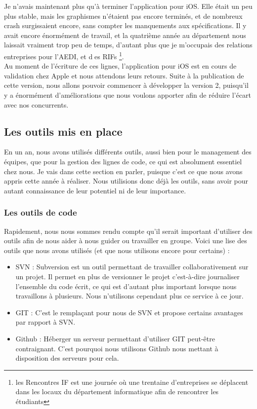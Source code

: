 \documentclass{article}
\begin{document}
		Je n'avais maintenant plus qu'à terminer l'application pour iOS. Elle était un peu plus stable, mais les graphismes n'étaient pas encore terminés, et de nombreux crash surgissaient encore, sans compter les manquements aux spécifications. Il y avait encore énormément de travail, et la quatrième année au département nous laissait vraiment trop peu de temps, d'autant plus que je m'occupais des relations entreprises pour l'AEDI, et des RIFs \footnote{les Rencontres IF est une journée où une trentaine d'entreprises se déplacent dans les locaux du département informatique afin de rencontrer les étudiants}. \\
		
		Au moment de l'écriture de ces lignes, l'application pour iOS est en cours de validation chez Apple et nous attendons leurs retours. Suite à la publication de cette version, nous allons pouvoir commencer à développer la version 2, puisqu'il y a énormément d'améliorations que nous voulons apporter afin de réduire l'écart avec nos concurrents. 
		
	\subsection{Les outils mis en place}
	En un an, nous avons utilisés différents outils, aussi bien pour le management des équipes, que pour la gestion des lignes de code, ce qui est absolument essentiel chez nous. Je vais dans cette section en parler, puisque c'est ce que nous avons appris cette année à réaliser. Nous utilisions donc déjà les outils, sans avoir pour autant connaissance de leur potentiel ni de leur importance.
		\subsubsection{Les outils de code}
		Rapidement, nous nous sommes rendu compte qu'il serait important d'utiliser des outils afin de nous aider à nous guider ou travailler en groupe. Voici une lise des outils que nous avons utilisés (et que nous utilisons encore pour certains) :
			\begin{itemize}
				\item SVN : Subversion est un outil permettant de travailler collaborativement sur un projet. Il permet en plus de versionner le projet c'est-à-dire journaliser l'ensemble du code écrit, ce qui est d'autant plus important lorsque nous travaillons à plusieurs. Nous n'utilisons cependant plus ce service à ce jour.
				\item GIT : C'est le remplaçant pour nous de SVN et propose certains avantages par rapport à SVN.
				\item Github : Héberger un serveur permettant d'utiliser GIT peut-être contraignant. C'est pourquoi nous utilisons Github nous mettant à disposition des serveurs pour cela. 
			\end{itemize}
		
\end{document}
